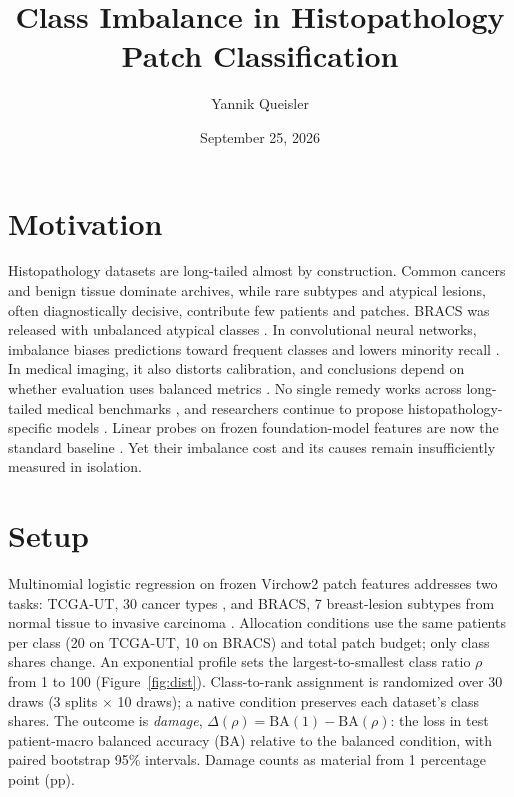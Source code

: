 \documentclass[11pt]{article}
\title{\vspace{-1cm}\LARGE Class Imbalance in Histopathology Patch Classification\vspace{-0.5em}}
\author{Yannik Queisler}
\date{September 25, 2026}
\begin{document}
\maketitle

\section{Motivation}
Histopathology datasets are long-tailed almost by construction. Common cancers and benign tissue dominate archives, while rare subtypes and atypical lesions, often diagnostically decisive, contribute few patients and patches. BRACS was released with unbalanced atypical classes \citep{brancati2022bracs}. In convolutional neural networks, imbalance biases predictions toward frequent classes and lowers minority recall \citep{buda2018classImbalance}. In medical imaging, it also distorts calibration, and conclusions depend on whether evaluation uses balanced metrics \citep{mosquera2024classImbalance}. No single remedy works across long-tailed medical benchmarks \citep{ju2024monicaBenchmark}, and researchers continue to propose histopathology-specific models \citep{cong2022imbalancedHistopathology}. Linear probes on frozen foundation-model features are now the standard baseline \citep{chen2024uni,zimmermann2024virchow2}. Yet their imbalance cost and its causes remain insufficiently measured in isolation.

\section{Setup}
Multinomial logistic regression on frozen Virchow2 patch features \citep{zimmermann2024virchow2} addresses two tasks: TCGA-UT, 30 cancer types \citep{komura2022universalEncoding}, and BRACS, 7 breast-lesion subtypes from normal tissue to invasive carcinoma \citep{brancati2022bracs}. Allocation conditions use the same patients per class (20 on TCGA-UT, 10 on BRACS) and total patch budget; only class shares change. An exponential profile sets the largest-to-smallest class ratio $\rho$ from 1 to 100 (Figure~\ref{fig:dist}). Class-to-rank assignment is randomized over 30 draws (3 splits $\times$ 10 draws); a native condition preserves each dataset's class shares. The outcome is \emph{damage}, $\Delta(\rho)=\mathrm{BA}(1)-\mathrm{BA}(\rho)$: the loss in test patient-macro balanced accuracy (BA) relative to the balanced condition, with paired bootstrap 95\% intervals. Damage counts as material from 1 percentage point (pp).
\end{document}
